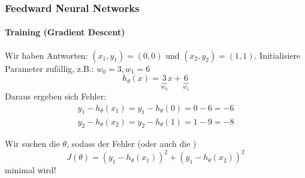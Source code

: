 \documentclass[german,aspectratio=169]{beamer}
\begin{document}
\begin{frame}
		\frametitle{Feedward Neural Networks}
		\framesubtitle{Training (Gradient Descent)}
		Wir haben Antworten: $(x_1, y_1) = (0,0)$ und $(x_2, y_2) = (1,1)$. Initialisiere Parameter zufällig, z.B.: $w_0 = 3, w_1 = 6$
		\begin{equation*}
			h_\theta(x) = \underbrace{3}_{w_0} x + \underbrace{6}_{w_1}
 		\end{equation*}
 		Daraus ergeben sich Fehler:
 		\begin{equation*}
 			\begin{split}
 				 y_1 - h_\theta(x_1) = y_1 - h_\theta(0) = 0 - 6 = -6\\
 				 y_2 - h_\theta(x_2) = y_2 - h_\theta(1) = 1 - 9 = -8
 			\end{split}
 		\end{equation*}
 		
		Wir suchen die  $\theta$, sodass der Fehler (oder auch die )
		\begin{equation*}
			J(\theta) = (y_1 - h_\theta(x_1))^2 + (y_1 - h_\theta(x_2))^2
		\end{equation*}
		minimal wird!
\end{frame}
\end{document}
